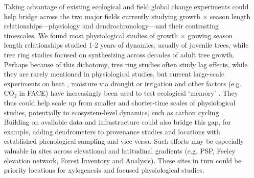 \documentclass[11pt]{article}
\begin{document}
Taking advantage of existing ecological and field global change experiments could help bridge across the two major fields currently studying growth $\times$ season length relationships---physiology and dendrochronology---and their contrasting timescales. We found most physiological studies of growth $\times$ growing season length relationships studied 1-2 years of dynamics, usually of juvenile trees, while tree ring studies focused on synthesizing across decades of adult tree growth. Perhaps because of this dichotomy, tree ring studies often study lag effects, while they are rarely mentioned in physiological studies, but current large-scale experiments on heat \citep[e.g. SPRUCE,][]{hanson2017attaining}, moisture via drought or irrigation \citep[e.g. DroughtNet, Pfynwald,][]{smith2016drought} and other factors (e.g. $\text{CO}_2$ in FACE) have increasingly been used to test ecological `memory' \citep[e.g. ][]{flinker2021promise, schweiger2022transgenerational}. They thus could help scale up from smaller and shorter-time scales of physiological studies, potentially to ecosystem-level dynamics, such as carbon cycling \citep{ding2021plant,jensen2019simulated}. Building on available data and infrastructure could also bridge this gap, for example, adding dendrometers to provenance studies \citep[or other ways to measure growth, e.g.,][]{montwe2016drought} and locations with established phenological sampling and vice versa. Such efforts may be especially valuable in sites across elevational and latitudinal gradients (e.g. PSP, Feeley elevation network, Forest Inventory and Analysis). These sites in turn could be priority locations for xylogenesis and focused physiological studies. 

\end{document}
